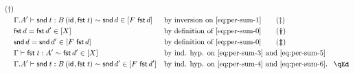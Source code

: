 \documentclass{LMCS}
\theoremstyle{plain}\newtheorem{satz}[thm]{Satz}
\newcommand{\proofLine}[2]{&#1&&\text{#2}}
\newcommand{\textdbldagger}{\textdagger\!\!\textdagger}
\newcommand{\textdbldaggerdbl}{\textdaggerdbl\!\!\textdaggerdbl}
\newcommand{\tfst}{\mathsf{fst}}
\newcommand{\tsnd}{\mathsf{snd}}
\newcommand{\ctxe}[2]{#1.#2}
\newcommand{\idsubs}[1]{\mathsf{id}_{#1}}
\newcommand{\exsubs}[2]{( #1, #2)}
\newcommand{\subsTy}[2]{#1\,#2}
\newcommand{\dfst}[1]{\mathsf{fst}\;#1}
\newcommand{\dsnd}[1]{\mathsf{snd}\;#1}
\newcommand{\subid}[2]{\exsubs{\idsubs{#1}}{#2}}
\newcommand{\dterm}[3]{#1\vdash#3:#2}
\newcommand{\rel}{\sim}
\newcommand{\fstnew}{\tfst\,}\newcommand{\sndnew}{\tsnd\,}
\begin{document}
{\begin{enumerate}[(a)]
\begin{enumerate}[(1)]
\begin{align*}
        \tag{\textdagger}\label{eq:per-sum-3}\\
      \proofLine{\dterm{\ctxe{\Gamma}{A'}}{\subsTy{B}{\subid{}{\dfst{t}}}}{\dsnd{t}}
        \rel \sndnew{d}\in [F\ \fstnew{d}]}{by inversion on \eqref{eq:per-sum-1}}
        \tag{\textdaggerdbl}\label{eq:per-sum-4}\\
      \proofLine{\fstnew{d}=\fstnew{d'}\in [X]}{by definition of \eqref{eq:per-sum-0}}\tag{\textdbldagger}\label{eq:per-sum-5}\\
      \proofLine{\sndnew{d}=\sndnew{d'}\in [F\ \fstnew{d}]}{by definition of \eqref{eq:per-sum-0}}
        \tag{\textdbldaggerdbl}\label{eq:per-sum-6}\\
      \proofLine{\dterm{\Gamma}{A'}{\dfst{t}} \rel \fstnew{d'}\in [X]}{by ind. hyp. on \eqref{eq:per-sum-3} and \eqref{eq:per-sum-5}}\\
      \proofLine{\dterm{\ctxe{\Gamma}{A'}}{\subsTy{B}{\subid{}{\dfst{t}}}}{\dsnd{t}}
        \rel \sndnew{d'}\in [F\ \fstnew{d'}]}{by ind. hyp. on \eqref{eq:per-sum-4} and \eqref{eq:per-sum-6}}.\rlap{\hbox to 29pt{\hfill\qEd}}
    \end{align*}
  \end{enumerate}
\end{enumerate}
}
\end{document}
